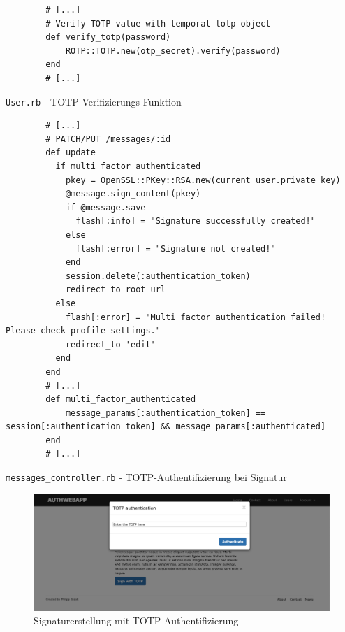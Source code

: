 \documentclass[11pt,a4paper,ngerman]{scrreprt}
\begin{document}
\begin{listing}[htpb]
    \begin{verbatim}
        # [...]
        # Verify TOTP value with temporal totp object
        def verify_totp(password)
            ROTP::TOTP.new(otp_secret).verify(password)
        end
        # [...]
    \end{verbatim}
    \caption{\texttt{User.rb} - TOTP-Verifizierungs Funktion}
    \label{lst:user.rb-verify-otp}
\end{listing}

\begin{listing}[htpb]
    \begin{verbatim}
        # [...]
        # PATCH/PUT /messages/:id
        def update
          if multi_factor_authenticated
            pkey = OpenSSL::PKey::RSA.new(current_user.private_key)
            @message.sign_content(pkey)
            if @message.save
              flash[:info] = "Signature successfully created!"
            else
              flash[:error] = "Signature not created!"
            end
            session.delete(:authentication_token)
            redirect_to root_url
          else
            flash[:error] = "Multi factor authentication failed! Please check profile settings."
            redirect_to 'edit'
          end
        end
        # [...]
        def multi_factor_authenticated
            message_params[:authentication_token] == session[:authentication_token] && message_params[:authenticated]
        end
        # [...]
    \end{verbatim}
    \caption{\texttt{messages\_controller.rb} - TOTP-Authentifizierung bei Signatur}
    \label{lst:messages_controller.rb-update}
\end{listing}

\begin{figure}[htbp]
    \centering
        \includegraphics[width=\textwidth]{Abbildungen/Authwebapp_Signatur_via_TOTP}
    \caption{Signaturerstellung mit TOTP Authentifizierung}
    \label{fig:Authwebapp_sign_TOTP}
\end{figure}
\clearpage
\end{document}
